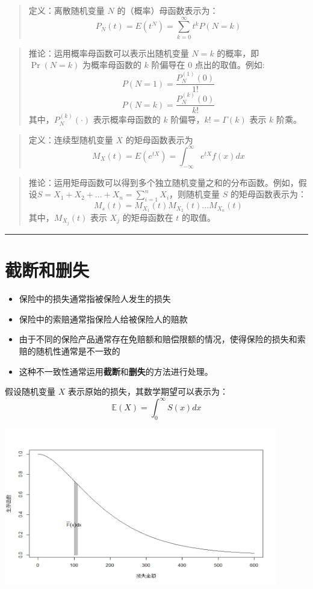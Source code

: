 \documentclass[
]{book}
\begin{document}
\begin{quote}
定义：离散随机变量 \(N\) 的（概率）母函数表示为：
\[
P_N(t)=E(t^N)=\sum_{k=0}^{\infty}t^kP(N=k)
\]
\end{quote}

\begin{quote}
推论：运用概率母函数可以表示出随机变量 \(N=k\) 的概率，即 \(\Pr(N=k)\) 为概率母函数的 \(k\) 阶偏导在 \(0\) 点出的取值。例如:
\[
P(N=1)=\frac{P_N^{(1)}(0)}{1!}\] \[P(N=k)=\frac{P_N^{(k)}(0)}{k!}
\]
其中，\(P_N^{(k)}(\cdot)\) 表示概率母函数的 \(k\) 阶偏导，\(k!=\Gamma(k)\) 表示 \(k\) 阶乘。
\end{quote}

\begin{quote}
定义：连续型随机变量 \(X\) 的矩母函数表示为 \[M_X(t)=E(e^{tX})=\int_{-\infty}^{\infty}e^{tX}f(x)dx\]
\end{quote}

\begin{quote}
推论：运用矩母函数可以得到多个独立随机变量之和的分布函数。例如，假设\(S=X_1+X_2+...+X_n=\sum_{i=1}^{n}X_i\)，则随机变量 \(S\) 的矩母函数表示为： \[M_s(t)=M_{X_1}(t)M_{X_2}(t)...M_{X_n}(t)\]
其中，\(M_{X_j}(t)\) 表示 \(X_j\) 的矩母函数在 \(t\) 的取值。
\end{quote}

\begin{center}\rule{0.5\linewidth}{0.5pt}\end{center}

\hypertarget{ux622aux65adux548cux5220ux5931}{%
\section{截断和删失}\label{ux622aux65adux548cux5220ux5931}}

\begin{itemize}
\item
  保险中的损失通常指被保险人发生的损失
\item
  保险中的索赔通常指保险人给被保险人的赔款
\item
  由于不同的保险产品通常存在免赔额和赔偿限额的情况，使得保险的损失和索赔的随机性通常是不一致的
\item
  这种不一致性通常运用\textbf{截断}和\textbf{删失}的方法进行处理。
\end{itemize}

假设随机变量 \(X\) 表示原始的损失，其数学期望可以表示为： \[\mathbb{E}(X)=\int_{0}^{\infty }{S(x)dx}\]

\includegraphics[width=4.6875in,height=\textheight]{picture/Expected.png}
\end{document}
